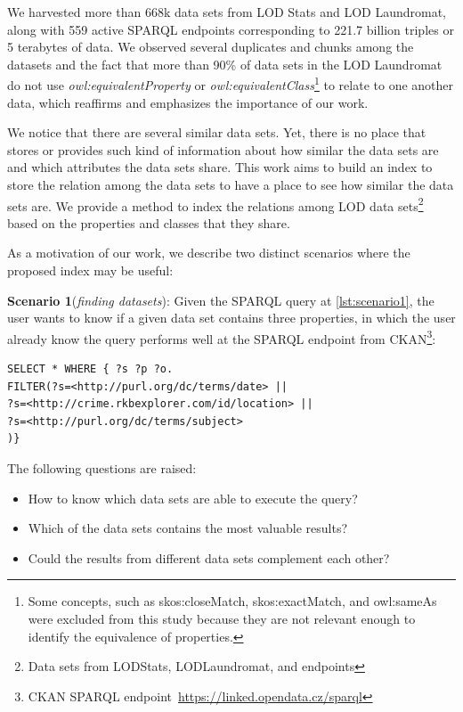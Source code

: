 \documentclass[sw]{iosart2x}
\begin{document}
We harvested more than 668k data sets from LOD Stats and LOD Laundromat, along with 559 active SPARQL endpoints corresponding to 221.7 billion triples or 5 terabytes of data. We observed several duplicates and chunks among the datasets and the fact that more than 90\% of data sets in the LOD Laundromat do not use \textit{owl:equivalentProperty} or \textit{owl:equivalentClass}\footnote{Some concepts, such as skos:closeMatch, skos:exactMatch, and owl:sameAs were excluded from this study because they are not relevant enough to identify the equivalence of properties.} to relate to one another data, which reaffirms and emphasizes the importance of our work.

We notice that there are several similar data sets.
Yet, there is no place that stores or provides such kind of information about how similar the data sets are and which attributes the data sets share. This work aims to build an index to store the relation among the data sets to have a place to see how similar the data sets are. We provide a method to index the relations among LOD data sets\footnote{Data sets from LODStats, LODLaundromat, and endpoints} based on the properties and classes that they share.

As a motivation of our work, we describe two distinct scenarios where the proposed index may be useful:

\textbf{Scenario 1}(\textit{finding datasets}): Given the SPARQL query at \cref{lst:scenario1}, the user wants to know if a given data set contains three properties, in which the user already know the query performs well at the SPARQL endpoint from CKAN\footnote{  CKAN SPARQL endpoint~\url{https://linked.opendata.cz/sparql}}:

\begin{lstlisting}[language=SPARQL, label={lst:scenario1}, caption=Scenario 1.]
SELECT * WHERE { ?s ?p ?o.
FILTER(?s=<http://purl.org/dc/terms/date> || 
?s=<http://crime.rkbexplorer.com/id/location> || 
?s=<http://purl.org/dc/terms/subject>
)}
\end{lstlisting}

The following questions are raised:
\begin{itemize}
    \item How to know which data sets are able to execute the query?
    \item Which of the data sets contains the most valuable results?
    \item Could the results from different data sets complement each other?
\end{itemize}
\end{document}
